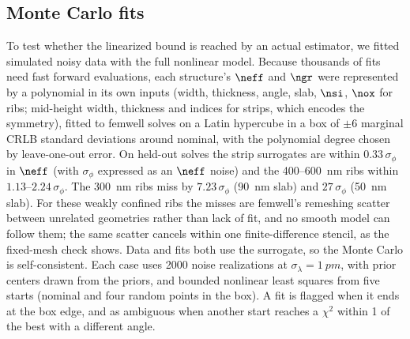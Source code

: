 \subsection{Monte Carlo fits}

To test whether the linearized bound is reached by an actual estimator, we fitted simulated noisy data with the full
nonlinear model. Because thousands of fits need fast forward evaluations, each structure's $\neff$ and $\ngr$ were
represented by a polynomial in its own inputs (width, thickness, angle, slab, $\nsi$, $\nox$ for ribs; mid-height width,
thickness and indices for strips, which encodes the symmetry), fitted to femwell solves on a Latin hypercube in a box of
$\pm6$ marginal CRLB standard deviations around nominal, with the polynomial degree chosen by leave-one-out error. On
held-out solves the strip surrogates are within $0.33\,\sigma_\phi$ in $\neff$ (with $\sigma_\phi$ expressed as an
$\neff$ noise) and the 400--\qty{600}{nm} ribs within $1.13$--$2.24\,\sigma_\phi$. The \qty{300}{nm} ribs miss by
$7.23\,\sigma_\phi$ (\qty{90}{nm} slab) and $27\,\sigma_\phi$ (\qty{50}{nm} slab). For these weakly confined ribs the
misses are femwell's remeshing scatter between unrelated geometries rather than lack of fit, and no smooth model can
follow them; the same scatter cancels within one finite-difference stencil, as the fixed-mesh check shows. Data and fits
both use the surrogate, so the Monte Carlo is self-consistent. Each case uses 2000 noise realizations at
$\sigma_\lambda=\qty{1}{pm}$, with prior centers drawn from the priors, and bounded nonlinear least squares from five
starts (nominal and four random points in the box). A fit is flagged when it ends at the box edge, and as ambiguous when
another start reaches a $\chi^2$ within 1 of the best with a different angle.
